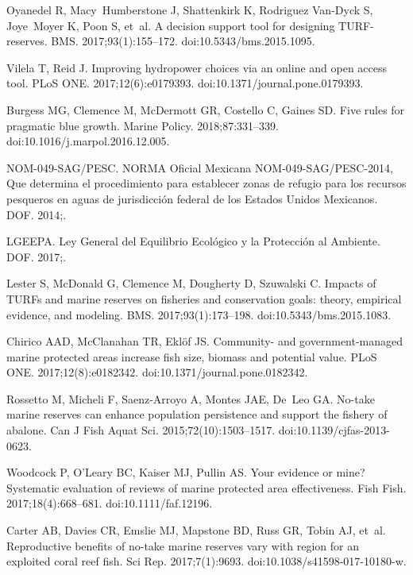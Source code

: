 \documentclass[10pt,letterpaper]{article}
\begin{document}
\begin{thebibliography}{10}
Oyanedel R, Macy~Humberstone J, Shattenkirk K, Rodriguez Van-Dyck S, Joye~Moyer
  K, Poon S, et~al.
\newblock A decision support tool for designing TURF-reserves.
\newblock BMS. 2017;93(1):155--172.
\newblock doi:{10.5343/bms.2015.1095}.

Vilela T, Reid J.
\newblock Improving hydropower choices via an online and open access tool.
\newblock PLoS ONE. 2017;12(6):e0179393.
\newblock doi:{10.1371/journal.pone.0179393}.

Burgess MG, Clemence M, McDermott GR, Costello C, Gaines SD.
\newblock Five rules for pragmatic blue growth.
\newblock Marine Policy. 2018;87:331--339.
\newblock doi:{10.1016/j.marpol.2016.12.005}.

NOM-049-SAG/PESC.
\newblock NORMA Oficial Mexicana NOM-049-SAG/PESC-2014, Que determina el
  procedimiento para establecer zonas de refugio para los recursos pesqueros en
  aguas de jurisdicción federal de los Estados Unidos Mexicanos.
\newblock DOF. 2014;.

LGEEPA.
\newblock Ley General del Equilibrio Ecológico y la Protección al Ambiente.
\newblock DOF. 2017;.

Lester S, McDonald G, Clemence M, Dougherty D, Szuwalski C.
\newblock Impacts of TURFs and marine reserves on fisheries and conservation
  goals: theory, empirical evidence, and modeling.
\newblock BMS. 2017;93(1):173--198.
\newblock doi:{10.5343/bms.2015.1083}.

Chirico AAD, McClanahan TR, Eklöf JS.
\newblock Community- and government-managed marine protected areas increase
  fish size, biomass and potential value.
\newblock PLoS ONE. 2017;12(8):e0182342.
\newblock doi:{10.1371/journal.pone.0182342}.

Rossetto M, Micheli F, Saenz-Arroyo A, Montes JAE, De~Leo GA.
\newblock No-take marine reserves can enhance population persistence and
  support the fishery of abalone.
\newblock Can J Fish Aquat Sci. 2015;72(10):1503--1517.
\newblock doi:{10.1139/cjfas-2013-0623}.

Woodcock P, O'Leary BC, Kaiser MJ, Pullin AS.
\newblock Your evidence or mine? Systematic evaluation of reviews of marine
  protected area effectiveness.
\newblock Fish Fish. 2017;18(4):668--681.
\newblock doi:{10.1111/faf.12196}.

Carter AB, Davies CR, Emslie MJ, Mapstone BD, Russ GR, Tobin AJ, et~al.
\newblock Reproductive benefits of no-take marine reserves vary with region for
  an exploited coral reef fish.
\newblock Sci Rep. 2017;7(1):9693.
\newblock doi:{10.1038/s41598-017-10180-w}.


\end{thebibliography}
\end{document}
